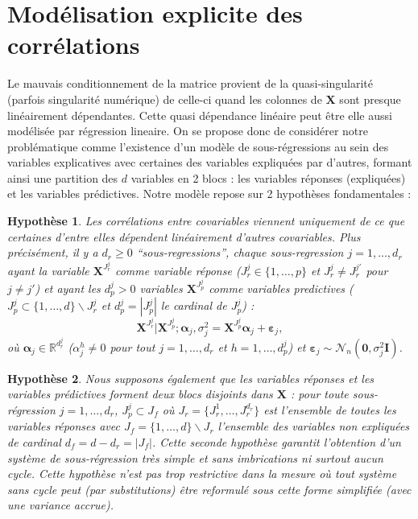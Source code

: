 \documentclass[12pt,a4paper]{report}
\newtheorem{hypfr}{Hypothèse}
\begin{document}
	\section{Modélisation explicite des corrélations}
	Le mauvais conditionnement de la matrice provient de la quasi-singularité (parfois singularité numérique) de celle-ci quand les colonnes de $\boldsymbol{X}$ sont presque linéairement dépendantes. Cette quasi dépendance linéaire peut être elle aussi modélisée par régression lineaire. On se propose donc de considérer notre problématique comme l'existence d'un modèle de sous-régressions au sein des variables explicatives avec certaines des variables expliquées par d'autres, formant ainsi une partition des $d$ variables en 2 blocs : les variables réponses (expliquées) et les variables prédictives. Notre modèle repose sur 2 hypothèses fondamentales :
	

\begin{hypfr}\label{H1fr}
Les corrélations entre covariables viennent uniquement de ce que certaines d'entre elles dépendent linéairement d'autres covariables. Plus précisément, il y a $d_{r}\geq 0$  ``sous-regressions'', chaque sous-regression $j=1,\ldots,d_{r}$ ayant la variable $\boldsymbol{X}^{J_{r}^j}$ comme variable {\it réponse} ($J_{r}^j\in\{1,\ldots,p\}$ et $J_{r}^j\neq J_{r}^{j'}$ pour $j\neq j'$) et ayant les $d_p^j>0$ variables $\boldsymbol{X}^{J_{p}^j}$  comme variables {\it predictives}  ($J_{p}^j\subset\{1,\ldots,d\} \backslash J_{r}^j$ et $d_p^j=|J_{p}^j|$ le cardinal de $J_{p}^j$) :
\begin{equation}
\boldsymbol{X}^{J_{r}^j}|\boldsymbol{X}^{J_{p}^j};\boldsymbol{\alpha}_j,\sigma^2_j=\boldsymbol{X}^{J_{p}^j}\boldsymbol{\alpha}_j+\boldsymbol{\varepsilon}_j, \label{eq:SR_fr}
\end{equation}
où $\boldsymbol{\alpha}_j\in{\mathbb{R}^{d_r^j}}$ (${\alpha}_j^h\neq 0$ pour tout $j=1,\ldots,d_r$ et $h=1,\ldots,d_p^j$) et $\boldsymbol{\varepsilon}_j \sim\mathcal{N}_n(\boldsymbol{0},\sigma^2_j\boldsymbol{I})$.
\end{hypfr}

\begin{hypfr}\label{H2fr}
Nous supposons également que les variables réponses et les variables prédictives forment deux blocs disjoints dans $\boldsymbol{X}$ :
 pour toute sous-régression $j=1,\ldots,d_{r}$, $J_{p}^j\subset J_f$ où $J_{r}=\{J_{r}^1,\ldots,J_{r}^{d_r}\}$ est l'ensemble de toutes les variables réponses avec $J_f=\{1,\ldots,d\} \backslash J_{r}$ l'ensemble des variables non expliquées de cardinal $d_f=d-d_r=|J_f|$. Cette seconde hypothèse garantit l'obtention d'un système de sous-régression très simple et sans imbrications ni surtout aucun cycle. Cette hypothèse n'est pas trop restrictive dans la mesure où tout système sans cycle peut (par substitutions) être reformulé sous cette forme simplifiée (avec une variance accrue).
\end{hypfr}
\end{document}
